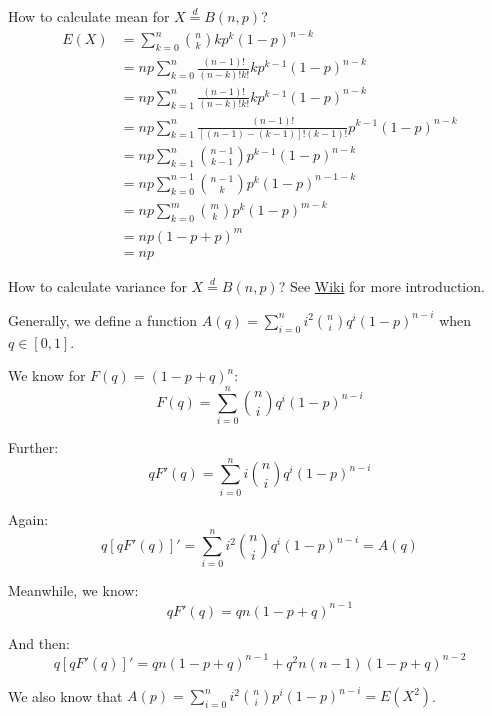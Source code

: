 \documentclass{article}
\begin{document}
How to calculate mean for \(X\stackrel{d}{=} B(n, p)\)?
\begin{equation*}
\begin{split}
E(X)&=\sum_{k=0}^n{n \choose k} kp^k(1-p)^{n-k}\\
&=np\sum_{k=0}^n\frac{(n-1)!}{(n-k)!k!} kp^{k-1}(1-p)^{n-k}\\
&=np\sum_{k=1}^n\frac{(n-1)!}{(n-k)!k!} kp^{k-1}(1-p)^{n-k}\\
&=np\sum_{k=1}^n\frac{(n-1)!}{[(n-1)-(k-1)]!(k-1)!}p^{k-1}(1-p)^{n-k}\\
&=np\sum_{k=1}^n{n-1 \choose k-1}p^{k-1}(1-p)^{n-k}\\
&=np\sum_{k=0}^{n-1}{n-1 \choose k}p^k(1-p)^{n-1-k}\\
&=np\sum_{k=0}^{m}{m \choose k}p^k(1-p)^{m-k}\\
&=np(1-p+p)^m\\
&=np
\end{split}
\end{equation*}

How to calculate variance for \(X\stackrel{d}{=} B(n, p)\)? See \href{https://en.wikipedia.org/wiki/Binomial_distribution#Variance}{Wiki} for more
introduction.

Generally, we define a function \(A(q)=\sum_{i=0}^ni^2{n \choose i}q^i(1-p)^{n-i}\) when \(q\in [0, 1]\).

We know for \(F(q) = (1-p+q)^n\):
\begin{equation*}
    F(q) = \sum_{i=0}^n {n \choose i}q^i(1-p)^{n-i}
\end{equation*}

Further:
\begin{equation*}
    qF'(q)=\sum_{i=0}^n i{n \choose i}q^{i}(1-p)^{n-i}
\end{equation*}

Again:
\begin{equation}
    q[qF'(q)]'=\sum_{i=0}^n i^2{n \choose i}q^i(1-p)^{n-i}=A(q)
\end{equation}

Meanwhile, we know:
\begin{equation*}
    qF'(q)=qn(1-p+q)^{n-1}
\end{equation*}

And then:
\begin{equation}
    q[qF'(q)]'=qn(1-p+q)^{n-1}+q^2n(n-1)(1-p+q)^{n-2}
\end{equation}

We also know that \(A(p)=\sum_{i=0}^ni^2{n \choose i}p^i(1-p)^{n-i}=E(X^2)\).
\end{document}
